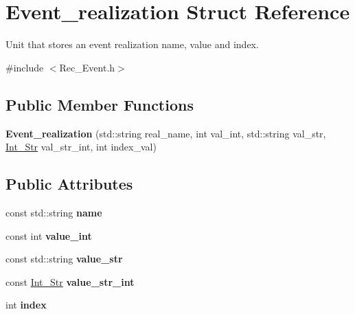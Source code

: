 \hypertarget{structEvent__realization}{}\section{Event\+\_\+realization Struct Reference}
\label{structEvent__realization}


Unit that stores an event realization name, value and index.  




{\ttfamily \#include $<$Rec\+\_\+\+Event.\+h$>$}

\subsection*{Public Member Functions}
\begin{DoxyCompactItemize}
\item 
\mbox{\label{structEvent__realization_a9556f59a2fbb2969f5a3a47a4efaa7ce}} 
{\bfseries Event\+\_\+realization} (std\+::string real\+\_\+name, int val\+\_\+int, std\+::string val\+\_\+str, \hyperlink{classInt__Str}{Int\+\_\+\+Str} val\+\_\+str\+\_\+int, int index\+\_\+val)
\end{DoxyCompactItemize}
\subsection*{Public Attributes}
\begin{DoxyCompactItemize}
\item 
\mbox{\label{structEvent__realization_a54404700e07462fe27aa6a7a6faefab9}} 
const std\+::string {\bfseries name}
\item 
\mbox{\label{structEvent__realization_a4d4c28a3c4e3caabce32d965a289181e}} 
const int {\bfseries value\+\_\+int}
\item 
\mbox{\label{structEvent__realization_a8ada58ba6fbd31d9c9c3b446581bd13f}} 
const std\+::string {\bfseries value\+\_\+str}
\item 
\mbox{\label{structEvent__realization_af6ed01e953ba786146c6ffb80f03919a}} 
const \hyperlink{classInt__Str}{Int\+\_\+\+Str} {\bfseries value\+\_\+str\+\_\+int}
\item 
\mbox{\label{structEvent__realization_aec4a3e1276c59e2585afa7313bc77202}} 
int {\bfseries index}
\end{DoxyCompactItemize}


